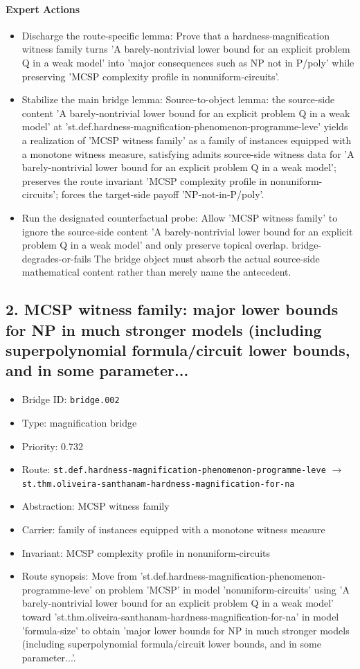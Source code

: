 \documentclass[11pt]{article}
\begin{document}
\paragraph{Expert Actions}
\begin{itemize}[leftmargin=*,itemsep=0.2em]
\item Discharge the route-specific lemma: Prove that a hardness-magnification witness family turns 'A barely-nontrivial lower bound for an explicit problem Q in a weak model' into 'major consequences such as NP not in P/poly' while preserving 'MCSP complexity profile in nonuniform-circuits'.
\item Stabilize the main bridge lemma: Source-to-object lemma: the source-side content 'A barely-nontrivial lower bound for an explicit problem Q in a weak model' at 'st.def.hardness-magnification-phenomenon-programme-leve' yields a realization of 'MCSP witness family' as a family of instances equipped with a monotone witness measure, satisfying admits source-side witness data for 'A barely-nontrivial lower bound for an explicit problem Q in a weak model'; preserves the route invariant 'MCSP complexity profile in nonuniform-circuits'; forces the target-side payoff 'NP-not-in-P/poly'.
\item Run the designated counterfactual probe: Allow 'MCSP witness family' to ignore the source-side content 'A barely-nontrivial lower bound for an explicit problem Q in a weak model' and only preserve topical overlap. bridge-degrades-or-fails The bridge object must absorb the actual source-side mathematical content rather than merely name the antecedent.
\end{itemize}
\subsection{2. MCSP witness family: major lower bounds for NP in much stronger models (including superpolynomial formula/circuit lower bounds, and in some parameter...}
\begin{itemize}[leftmargin=*,itemsep=0.25em]
\item Bridge ID: \texttt{bridge.002}
\item Type: magnification bridge
\item Priority: 0.732
\item Route: \texttt{st.def.hardness-magnification-phenomenon-programme-leve} $\rightarrow$ \texttt{st.thm.oliveira-santhanam-hardness-magnification-for-na}
\item Abstraction: MCSP witness family
\item Carrier: family of instances equipped with a monotone witness measure
\item Invariant: MCSP complexity profile in nonuniform-circuits
\item Route synopsis: Move from 'st.def.hardness-magnification-phenomenon-programme-leve' on problem 'MCSP' in model 'nonuniform-circuits' using 'A barely-nontrivial lower bound for an explicit problem Q in a weak model' toward 'st.thm.oliveira-santhanam-hardness-magnification-for-na' in model 'formula-size' to obtain 'major lower bounds for NP in much stronger models (including superpolynomial formula/circuit lower bounds, and in some parameter...'.
\end{itemize}
\end{document}
